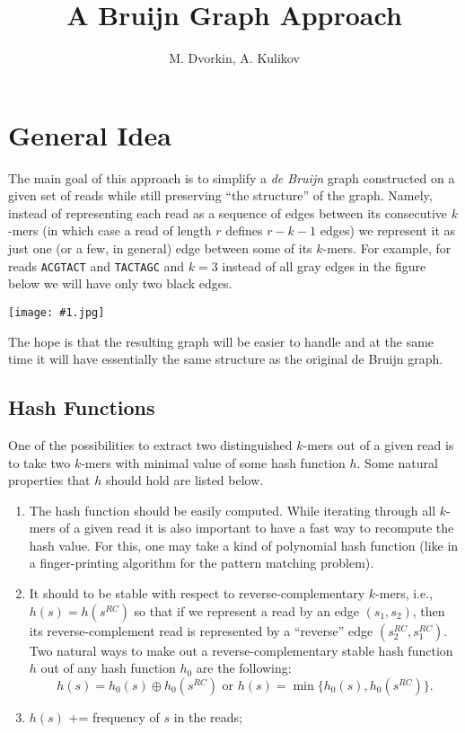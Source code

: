 \documentclass[12pt]{article}
\newcommand{\jpgpic}[1]{\begin{center}\texttt{[image: \#1.jpg]}\end{center}}
\begin{document}
\author{M. Dvorkin, A. Kulikov}
\title{A Bruijn Graph Approach}
\maketitle

\section{General Idea}

The main goal of this approach is to simplify a \emph{de Bruijn} graph
constructed on a given set of reads while still preserving 
``the structure'' of the graph. Namely, instead 
of representing each read as a sequence of edges 
between its consecutive $k$-mers (in which case a read of length $r$ defines
$r-k-1$ edges) we represent it as just one (or a few, in general)
edge between some of its $k$-mers. For example, for 
reads {\tt ACGTACT} and {\tt TACTAGC} and $k=3$
instead of all gray edges in the figure below we will have 
only two black edges.
\jpgpic{fig1}
The hope is that the resulting graph will be easier to handle 
and at the same time it will have essentially the same structure 
as the original de Bruijn graph.

\subsection{Hash Functions}

One of the possibilities to extract two distinguished $k$-mers out of a given
read is to take two $k$-mers with minimal value of some hash function $h$.
Some natural properties that $h$ should hold are listed below.
\begin{enumerate}
  \item The hash function should be easily computed.
  While iterating through all $k$-mers of a given read
  it is also important to have a fast way to recompute 
  the hash value. For this, one may take a kind of polynomial
  hash function (like in a finger-printing algorithm for the pattern 
  matching problem).
  \item It should to be stable with respect to reverse-complementary 
  $k$-mers, i.e., $h(s) = h(s^{RC})$ so that if we represent a read
  by an edge $(s_1,s_2)$, then its reverse-complement read is represented by 
  a ``reverse'' edge $(s_2^{RC},s_1^{RC})$. Two natural ways to make out a
  reverse-complementary stable hash function $h$ out of any hash function 
  $h_0$ are the following:
  \[h(s) = h_0(s) \oplus h_0(s^{RC}) \textrm{ or } h(s) = \min\{h_0(s), h_0(s^{RC})\} .\]
  \item $h(s)$ += frequency of $s$ in the reads;

\end{enumerate}
\end{document}
